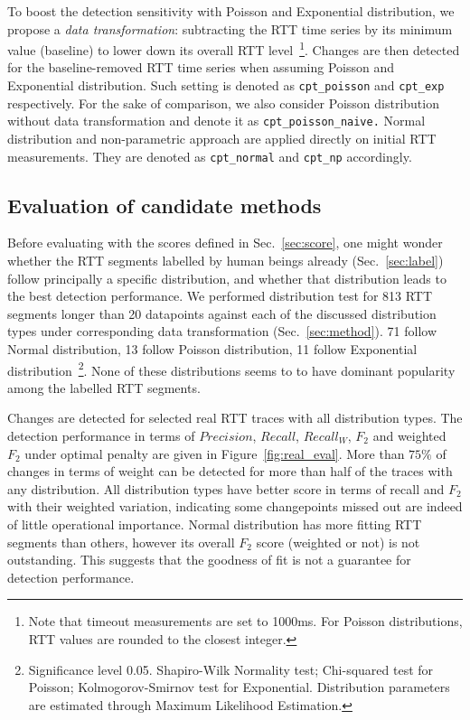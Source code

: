 To boost the detection sensitivity with Poisson and Exponential distribution, we propose a \textit{data transformation}: subtracting the RTT time series by its minimum value (baseline) to lower down its overall RTT level~\footnote{Note that timeout measurements are set to 1000ms. For Poisson distributions, RTT values are rounded to the closest integer.}. 
Changes are then detected for the baseline-removed RTT time series when assuming Poisson and Exponential distribution.
Such setting is denoted as \texttt{cpt\_poisson} and \texttt{cpt\_exp} respectively.
For the sake of comparison, we also consider Poisson distribution without data transformation and denote it as \texttt{cpt\_poisson\_naive.}
Normal distribution and non-parametric approach are applied directly on initial RTT measurements.
They are denoted as \texttt{cpt\_normal} and \texttt{cpt\_np} accordingly.

\subsection{Evaluation of candidate methods}
\label{sec:eval}

Before evaluating with the scores defined in Sec.~\ref{sec:score}, one might wonder whether the RTT segments labelled by human beings already (Sec.~\ref{sec:label}) follow principally a specific distribution, and whether that distribution leads to the best detection performance.
We performed distribution test for 813 RTT segments longer than 20 datapoints against each of the discussed distribution types under corresponding data transformation (Sec.~\ref{sec:method}). 71 follow Normal distribution, 13 follow Poisson distribution, 
11 follow Exponential distribution~\footnote{Significance level 0.05. Shapiro-Wilk Normality test; %
Chi-squared test for Poisson; Kolmogorov-Smirnov test for Exponential. Distribution parameters are estimated through Maximum Likelihood Estimation.}. None of these distributions seems to to have dominant popularity among the labelled RTT segments.

Changes are detected for selected real RTT traces with all distribution types.
The detection performance in terms of $Precision$, $Recall$, $Recall_W$, $F_2$ and weighted $F_2$ under optimal penalty are given in Figure~\ref{fig:real_eval}.
More than $75\%$ of changes in terms of weight can be detected for more than half of the traces with any distribution.
All distribution types have better score in terms of recall and $F_2$ with their weighted variation, indicating some changepoints missed out are indeed of little operational importance.
Normal distribution has more fitting RTT segments than others, however its overall $F_2$ score (weighted or not) is not outstanding. This suggests that the goodness of fit is not a guarantee for detection performance.

